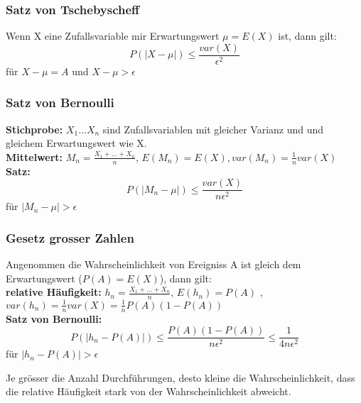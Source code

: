 \documentclass[margin=normal]{tex/hsrzf}
\begin{document}
\begin{multicols}{2}
    \subsubsection*{Satz von Tschebyscheff}
    Wenn X eine Zufallsvariable mir Erwartungswert $\mu = E(X)$ ist, dann gilt:
    $$P(|X-\mu|)\leq \frac{var(X)}{\epsilon^2}$$
    für $X-\mu = A$ und $X-\mu > \epsilon$

    \subsubsection*{Satz von Bernoulli}
    \textbf{Stichprobe:} $X_1 \dots X_n$ sind Zufallsvariablen mit gleicher Varianz und und gleichem Erwartungswert wie X.
    \\ \textbf{Mittelwert:} $M_n = \frac{X_1+\dots+ X_n}{n}$, $E(M_n) = E(X), var(M_n) =\frac{1}{n} var(X)$
    \\ \textbf{Satz:} $$P(|M_n -\mu|) \leq \frac{var(X)}{n\epsilon^2} $$
    für $|M_n -\mu| > \epsilon$
    \subsubsection*{Gesetz grosser Zahlen}
    Angenommen die Wahrscheinlichkeit von Ereigniss A ist gleich dem Erwartungswert ($P(A) = E(X)$), dann gilt:
    \\ \textbf{relative Häufigkeit:} $h_n = \frac{X_1+ \dots + X_n}{n}$, $E(h_n) = P(A)$ , $ var(h_n) = \frac{1}{n} var(X) = \frac{1}{n}P(A)(1-P(A))$
    \\ \textbf{Satz von Bernoulli:}
    $$P(|h_n - P(A)|) \leq \frac{P(A)(1-P(A))}{n\epsilon^2} \leq \frac{1}{4n\epsilon^2} $$
    für $|h_n - P(A)| > \epsilon$

    \tiny{Je grösser die Anzahl Durchführungen, desto kleine die Wahrscheinlichkeit, dass die relative Häufigkeit stark von der Wahrscheinlichkeit abweicht.}
\end{multicols}
\end{document}
